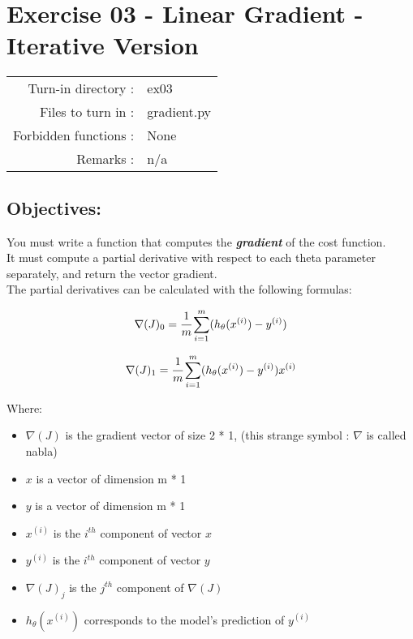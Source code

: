 \documentclass[]{article}
\begin{document}
\hypertarget{exercise-03---linear-gradient---iterative-version-1}{%
\section{Exercise 03 - Linear Gradient - Iterative
Version}\label{exercise-03---linear-gradient---iterative-version-1}}

\begin{longtable}[]{@{}rl@{}}
\toprule
\endhead
Turn-in directory : & ex03\tabularnewline
Files to turn in : & gradient.py\tabularnewline
Forbidden functions : & None\tabularnewline
Remarks : & n/a\tabularnewline
\bottomrule
\end{longtable}

\hypertarget{objectives-2}{%
\subsection{Objectives:}\label{objectives-2}}

You must write a function that computes the \emph{\textbf{gradient}} of
the cost function.\\
It must compute a partial derivative with respect to each theta
parameter separately, and return the vector gradient.\\
The partial derivatives can be calculated with the following formulas:

\large

\[
\nabla(J)_0 = \cfrac{1}{m}\sum_{i=1}^{m}(h_{\theta}(x^{(i)}) - y^{(i)})
\] \normalsize

\large

\[
\nabla(J)_1 = \cfrac{1}{m}\sum_{i=1}^{m}(h_{\theta}(x^{(i)}) - y^{(i)})x^{(i)}
\] \normalsize

Where:

\begin{itemize}
\item
  \(\nabla(J)\) is the gradient vector of size 2 * 1, (this strange
  symbol : \(\nabla\) is called nabla)
\item
  \(x\) is a vector of dimension m * 1
\item
  \(y\) is a vector of dimension m * 1
\item
  \(x^{(i)}\) is the \(i^{th}\) component of vector \(x\)
\item
  \(y^{(i)}\) is the \(i^{th}\) component of vector \(y\)
\item
  \(\nabla(J)_j\) is the \(j^{th}\) component of \(\nabla(J)\)
\item
  \(h_{\theta}(x^{(i)})\) corresponds to the model's prediction of
  \(y^{(i)}\)
\end{itemize}
\end{document}
